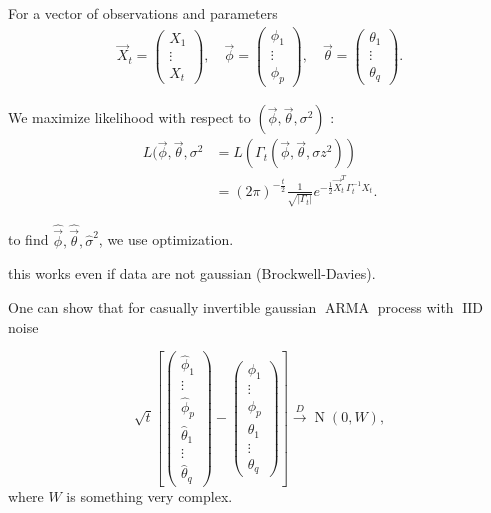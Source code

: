 \documentclass[12pt,a4paper, notitlepage]{book}
\theoremstyle{definition} %
\theoremstyle{plain} %
\DeclareMathOperator{\No}{N}
\DeclareMathOperator{\Iid}{IID}
\DeclareMathOperator{\Arma}{ARMA}
\begin{document}
For a vector of observations and parameters 
\begin{align*}
\vec{X}_t  = \left( \begin{array}{c} X_1  \\ \vdots \\ X_t \end{array} \right) , \quad
\vec{\phi} = \left( \begin{array}{c} \phi _1 \\ \vdots \\ \phi _p \end{array} \right) , \quad
\vec{\theta } =  \left( \begin{array}{c} \theta _1 \\ \vdots \\ \theta _q \end{array} \right)  .
\end{align*}

We maximize likelihood with respect to $ (\vec{\phi}, \vec{\theta}, \sigma ^2 ) $ :
\begin{align*}
 L(\vec{\phi}, \vec{\theta}, \sigma ^2 & =  L( \Gamma _t ( \vec{\phi}, \vec{\theta}, \sigma z^2)) \\
 & = (2 \pi)^{- \frac{t}{2}} \frac{1}{ \sqrt{|\Gamma_t| }} e^{- \frac{1}{2} \vec{X}^T _t \Gamma _t ^{-1} X_t  } .
\end{align*}

to find $ \hat{\vec{\phi}} , \hat{\vec{\theta}} , \hat{\sigma}^2 $, we use  %
optimization.

this works even if data are not gaussian (Brockwell-Davies).

One can show that for casually invertible gaussian $ \Arma $ process with $ \Iid $ noise 

\[ 
\sqrt{t} \left[
\left( \begin{array}{c} \hat{\phi} _1 \\ \vdots \\  \hat{\phi} _p \\ \hat{\theta} _1 \\ \vdots \\ \hat{\theta} _q \end{array} \right)
- \left( \begin{array}{c} \phi _1 \\ \vdots \\ \phi _p \\ \theta _1 \\ \vdots \\ \theta _q \end{array} \right) \right] 
\overset{D}{\rightarrow} \No(0, W ) , \]
where $ W $ is something very complex.
\end{document}
